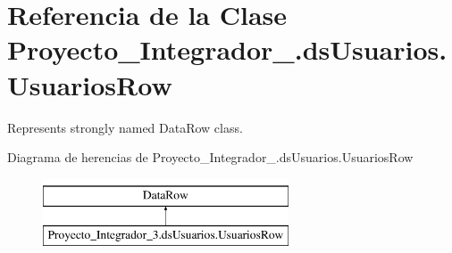 \hypertarget{class_proyecto___integrador__3_1_1ds_usuarios_1_1_usuarios_row}{\section{Referencia de la Clase Proyecto\-\_\-\-Integrador\-\_.\-ds\-Usuarios.\-Usuarios\-Row}
\label{class_proyecto___integrador__3_1_1ds_usuarios_1_1_usuarios_row}
}


Represents strongly named Data\-Row class.  


Diagrama de herencias de Proyecto\-\_\-\-Integrador\-\_.\-ds\-Usuarios.\-Usuarios\-Row\begin{figure}[H]
\begin{center}
\leavevmode
\includegraphics[height=2.000000cm]{d2/d7f/class_proyecto___integrador__3_1_1ds_usuarios_1_1_usuarios_row}
\end{center}
\end{figure}
